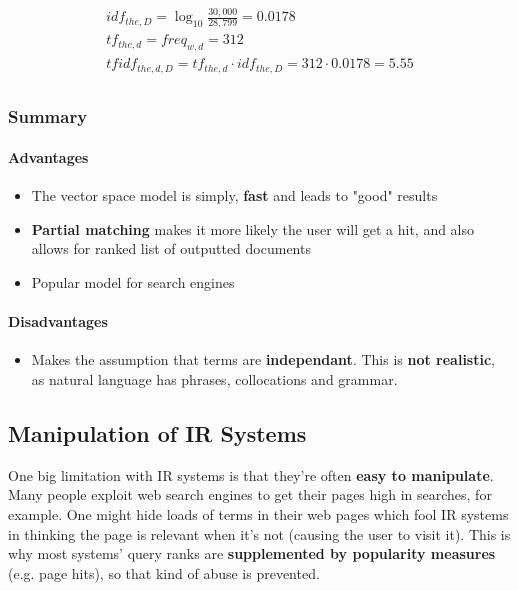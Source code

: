 \documentclass{article}
\begin{document}
\begin{multline}\\
	idf_{the,D} = \log_{10} \frac{30,000}{28,799} = 0.0178 \\
	tf_{the,d} = freq_{w,d} = 312 \\
	tfidf_{the,d,D} = tf_{the,d} \cdot idf_{the,D} = 312 \cdot 0.0178 = 5.55 \\
	\label{eq:tf-idf-example}
\end{multline}

\subsubsection{Summary}

\paragraph{\textbf{Advantages}}
\begin{itemize}
	\item The vector space model is simply, \textbf{fast} and leads to "good" results
	\item \textbf{Partial matching} makes it more likely the user will get a hit, and also allows for ranked list of outputted documents
	\item Popular model for search engines
\end{itemize}
\paragraph{\textbf{Disadvantages}}
\begin{itemize}
	\item Makes the assumption that terms are \textbf{independant}. This is \textbf{not realistic}, as natural language has phrases, collocations and grammar.
\end{itemize}

\subsection{Manipulation of IR Systems}

One big limitation with IR systems is that they're often \textbf{easy to manipulate}. Many people exploit web search engines to get their pages high in searches, for example. One might hide loads of terms in their web pages which fool IR systems in thinking the page is relevant when it's not (causing the user to visit it). This is why most systems' query ranks are \textbf{supplemented by popularity measures} (e.g. page hits), so that kind of abuse is prevented.
\end{document}
